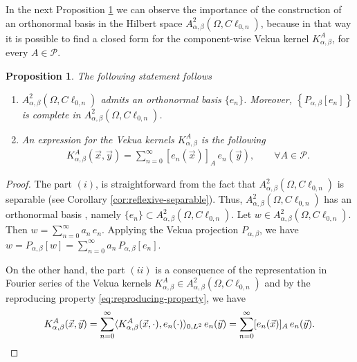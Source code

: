 \documentclass[12pt]{article}
\newtheorem{proposition}[theorem]{Proposition}
\begin{document}
In the next Proposition \ref{prop:several-properties} we can observe the importance of the construction of an orthonormal basis in the Hilbert space $A_{\alpha,\beta}^2(\Omega, C\ell_{0,n})$, because in that way it is possible to find a closed form for the component-wise Vekua kernel $K_{\alpha,\beta}^A$, for every $A\in \mathcal{P}$. 
\begin{proposition}\label{prop:several-properties}
The following statement follows
\begin{enumerate}
\item [(i)] $A_{\alpha,\beta}^2(\Omega,C\ell_{0,n})$ admits an orthonormal basis $\{e_n\}$. Moreover, $\left\{P_{\alpha,\beta}[e_n] \right\}$ is complete in $A_{\alpha,\beta}^2(\Omega,C\ell_{0,n})$.
\item[(ii)] An expression for the Vekua kernels $ K_{\alpha,\beta}^A$ is the following
\begin{align*}
    K_{\alpha,\beta}^A(\vec x,\vec y)=\sum_{n=0}^{\infty} [e_n(\vec x)]_A \, e_n(\vec y), \qquad \forall A\in \mathcal{P}.
\end{align*}
\end{enumerate}
\end{proposition}
\begin{proof}
The part $(i)$, is straightforward from the fact that $A_{\alpha,\beta}^2(\Omega,C\ell_{0,n})$ is separable (see Corollary \ref{cor:reflexive-separable}). Thus, $A_{\alpha,\beta}^2(\Omega,C\ell_{0,n})$ has an orthonormal basis \cite[Th.\ 5.11]{Brezis2011}, namely $\{e_n\}\subset A_{\alpha,\beta}^2(\Omega,C\ell_{0,n})$. 
Let $w\in A_{\alpha,\beta}^2(\Omega,C\ell_{0,n})$. Then $w=\sum_{n=0}^{\infty} a_n \,e_n$. Applying the Vekua projection $P_{\alpha,\beta}$, we have $w=P_{\alpha,\beta}[w] =\sum_{n=0}^{\infty} a_n \, P_{\alpha,\beta}[e_n]$. 

On the other hand, the part $(ii)$ is a consequence of the representation in Fourier series \cite[Cor.\ 5.10]{Brezis2011} of the Vekua kernels $K_{\alpha,\beta}^A\in A^2_{\alpha,\beta}(\Omega,C\ell_{0,n})$ and by the reproducing property \eqref{eq:reproducing-property}, we have
\[
K_{\alpha,\beta}^A(\vec x,\vec y)=\sum_{n=0}^{\infty}  \langle K_{\alpha,\beta}^A(\vec x,\cdot), e_n(\cdot)\rangle_{0,L^2}\, e_n(\vec y)=\sum_{n=0}^{\infty} [e_n(\vec x)]_A \, e_n(\vec y).\qedhere
\]
\end{proof}
\end{document}
